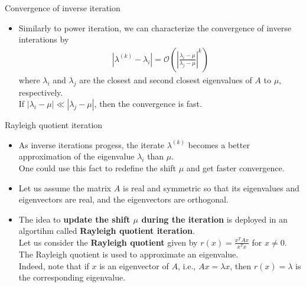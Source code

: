 \documentclass[t,usepdftitle=false]{beamer}
\begin{document}
\begin{frame}{Convergence of inverse iteration}
\begin{itemize}
\item Similarly to power iteration, we can characterize the convergence of inverse interations by
\begin{align*}
|\lambda^{(k)}-\lambda_i|=\mathcal{O}\left(\left|\frac{\lambda_i-\mu}{\lambda_j-\mu}\right|^k\right)
\end{align*}
where $\lambda_i$ and $\lambda_j$ are the closest and second closest eigenvalues of $A$ to $\mu$, respectively.\vspace{.1cm}\\
If $|\lambda_i-\mu|\ll|\lambda_j-\mu|$, then the convergence is fast.
\end{itemize}
\end{frame}

\begin{frame}{Rayleigh quotient iteration}
\begin{itemize}
\item As inverse iterations progess, the iterate $\lambda^{(k)}$ becomes a better approximation of the eigenvalue $\lambda_i$ than $\mu$.\vspace{.1cm}\\
One could use this fact to redefine the shift $\mu$ and get faster convergence.
\item Let us assume the matrix $A$ is real and symmetric so that its eigenvalues and eigenvectors are real, and the eigenvectors are orthogonal.
\item The idea to \textbf{update the shift $\mu$ during the iteration} is deployed in an algortihm called \textbf{Rayleigh quotient iteration}.\vspace{.1cm}\\
Let us consider the \textbf{Rayleigh quotient} given by $r(x)=\frac{x^TAx}{x^Tx}$ for $x\neq 0$.\vspace{.1cm}\\
The Rayleigh quotient is used to approximate an eigenvalue.\vspace{.1cm}\\
Indeed, note that if $x$ is an eigenvector of $A$, i.e., $Ax=\lambda x$, then $r(x)=\lambda$ is the corresponding eigenvalue.
\end{itemize}
\end{frame}
\end{document}

